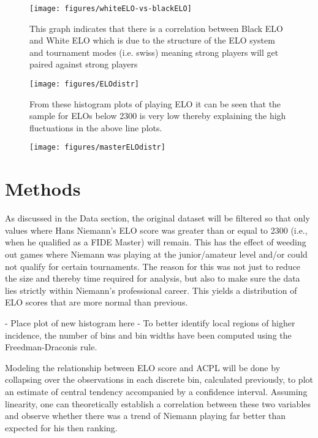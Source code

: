 \documentclass[12pt, letterpaper, titlepage]{article}
\begin{document}
\begin{figure}
    \centering
    \texttt{[image: figures/whiteELO-vs-blackELO]}
    \caption{This graph indicates that there is a correlation between Black ELO and White ELO which is due to the structure of the ELO system and tournament modes (i.e. swiss) meaning strong players will get paired against strong players}
    \label{fig:elo_lineplot}
\end{figure}

\begin{figure}
    \centering
    \texttt{[image: figures/ELOdistr]}
    \caption{From these histogram plots of playing ELO it can be seen that the sample for ELOs below 2300 is very low thereby explaining the high fluctuations in the above line plots.}
    \label{fig:elo_histplot}
\end{figure}

\begin{figure}
    \centering
    \texttt{[image: figures/masterELOdistr]}
    \caption{}
    \label{fig:elogt23_histplot}
\end{figure}

\section*{Methods}
\label{sec:meth}

As discussed in the Data section, the original dataset will be filtered so that only values where Hans Niemann's ELO score was greater than or equal to 2300 (i.e., when he qualified as a FIDE Master) will remain. This has the effect of weeding out games where Niemann was playing at the junior/amateur level and/or could not qualify for certain tournaments. The reason for this was not just to reduce the size and thereby time required for analysis, but also to make sure the data lies strictly within Niemann's professional career. This yields a distribution of ELO scores that are more normal than previous.

-	Place plot of new histogram here
-	To better identify local regions of higher incidence, the number of bins and bin widths have been computed using the Freedman-Draconis rule.

Modeling the relationship between ELO score and ACPL will be done by collapsing over the observations in each discrete bin, calculated previously, to plot an estimate of central tendency accompanied by a confidence interval. Assuming linearity, one can theoretically establish a correlation between these two variables and observe whether there was a trend of Niemann playing far better than expected for his then ranking.
\end{document}
